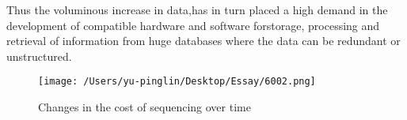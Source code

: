 \documentclass{article}
\begin{document}
Thus the voluminous increase in data,has in turn placed a high demand in the development of compatible hardware and software forstorage, processing and retrieval of information from huge databases where the data can be redundant or unstructured. 





\begin{figure}[H]
\texttt{[image: /Users/yu-pinglin/Desktop/Essay/6002.png]}
\centering
\caption{Changes in the cost of sequencing over time}
\end{figure}









\end{document}
